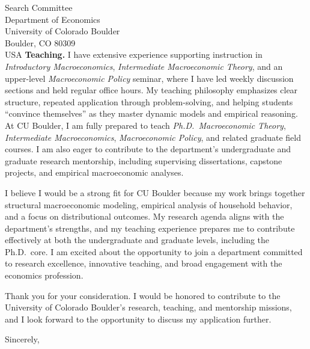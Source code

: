 \documentclass[11pt,letterpaper]{letter}
\begin{document}
\begin{letter}{Search Committee \\
Department of Economics \\
University of Colorado Boulder \\
Boulder, CO 80309 \\ USA}
\textbf{Teaching.} I have extensive experience supporting instruction in \textit{Introductory Macroeconomics}, \textit{Intermediate Macroeconomic Theory}, and an upper-level \textit{Macroeconomic Policy} seminar, where I have led weekly discussion sections and held regular office hours. My teaching philosophy emphasizes clear structure, repeated application through problem-solving, and helping students “convince themselves” as they master dynamic models and empirical reasoning. At CU Boulder, I am fully prepared to teach \textit{Ph.D.\ Macroeconomic Theory}, \textit{Intermediate Macroeconomics}, \textit{Macroeconomic Policy}, and related graduate field courses. I am also eager to contribute to the department’s undergraduate and graduate research mentorship, including supervising dissertations, capstone projects, and empirical macroeconomic analyses.

I believe I would be a strong fit for CU Boulder because my work brings together structural macroeconomic modeling, empirical analysis of household behavior, and a focus on distributional outcomes. My research agenda aligns with the department’s strengths, and my teaching experience prepares me to contribute effectively at both the undergraduate and graduate levels, including the Ph.D.\ core. I am excited about the opportunity to join a department committed to research excellence, innovative teaching, and broad engagement with the economics profession.

Thank you for your consideration. I would be honored to contribute to the University of Colorado Boulder’s research, teaching, and mentorship missions, and I look forward to the opportunity to discuss my application further.

\closing{Sincerely,}

\end{letter}
\end{document}
